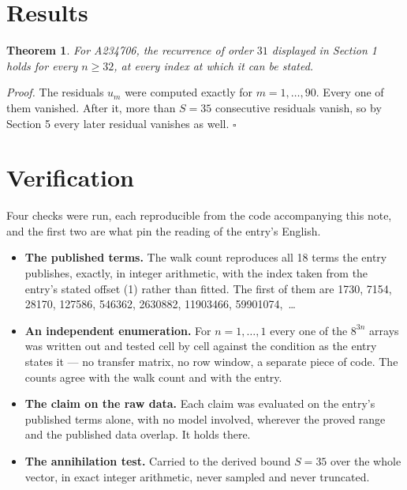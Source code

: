 \documentclass[11pt]{article}
\newtheorem{theorem}{Theorem}
\theoremstyle{definition}
\begin{document}
\section{Results}

\begin{theorem} For A234706, the recurrence of order $31$ displayed in Section 1 holds for every $n \ge 32$, at every index at which it can be stated.\end{theorem}

{\itshape Proof.} The residuals $u_m$ were computed exactly for $m = 1,\dots,90$. Every one of them vanished. After it, more than $S = 35$ consecutive residuals vanish, so by Section 5 every later residual vanishes as well. $\square$

\section{Verification}

Four checks were run, each reproducible from the code accompanying this note, and the first two are what pin the reading of the entry's English.

\begin{itemize}

\item {\bfseries The published terms.} The walk count reproduces all 18 terms the entry publishes, exactly, in integer arithmetic, with the index taken from the entry's stated offset (1) rather than fitted. The first of them are 1730, 7154, 28170, 127586, 546362, 2630882, 11903466, 59901074,~\dots

\item {\bfseries An independent enumeration.} For $n = 1,\dots,1$ every one of the $8^{3n}$ arrays was written out and tested cell by cell against the condition as the entry states it --- no transfer matrix, no row window, a separate piece of code. The counts agree with the walk count and with the entry.

\item {\bfseries The claim on the raw data.} Each claim was evaluated on the entry's published terms alone, with no model involved, wherever the proved range and the published data overlap. It holds there.

\item {\bfseries The annihilation test.} Carried to the derived bound $S = 35$ over the whole vector, in exact integer arithmetic, never sampled and never truncated.

\end{itemize}
\end{document}
